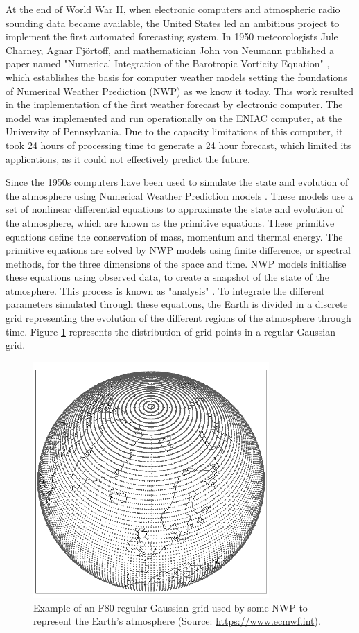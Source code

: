 At the end of World War II, when electronic computers and atmospheric radio sounding data became available, the United States led an ambitious project to implement the first automated forecasting system. In 1950 meteorologists Jule Charney, Agnar Fjörtoff, and mathematician John von Neumann published a paper named "Numerical Integration of the Barotropic Vorticity Equation" \citep{charney1950numerical}, which establishes the basis for computer weather models setting the foundations of Numerical Weather Prediction (NWP) as we know it today. This work resulted in the implementation of the first weather forecast by electronic computer. The model was implemented and run operationally on the ENIAC computer, at the University of Pennsylvania. Due to the capacity limitations of this computer, it took 24 hours of processing time to generate a 24 hour forecast, which limited its applications, as it could not effectively predict the future.

\medskip

Since the 1950s computers have been used to simulate the state and evolution of the atmosphere using Numerical Weather Prediction models \citep{kimura2002numerical}. These models use a set of nonlinear differential equations to approximate the state and evolution of the atmosphere, which are known as the primitive equations. These primitive equations define the conservation of mass, momentum and thermal energy. The primitive equations are solved by NWP models using finite difference, or spectral methods, for the three dimensions of the space and time. NWP models initialise these equations using observed data, to create a snapshot of the state of the atmosphere. This process is known as "analysis" \citep{courtier1994strategy}. To integrate the different parameters simulated through these equations, the Earth is divided in a discrete grid representing the evolution of the different regions of the atmosphere through time. Figure \ref{N80} represents the distribution of grid points in a regular Gaussian grid.

\medskip

\begin{figure}[h]
 \centerline{\includegraphics[width=9cm]{N80_regular.png}} \caption{Example of an F80 regular Gaussian grid used by some NWP to represent the Earth's atmosphere (Source: \url{https://www.ecmwf.int}).}\label{N80}
\end{figure}

